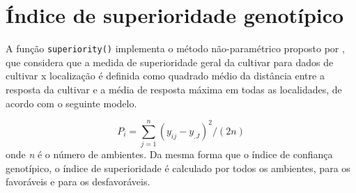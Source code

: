 \documentclass[
]{book}
\newenvironment{Shaded}{\begin{snugshade}}{\end{snugshade}}
\newcommand{\CommentTok}[1]{\textcolor[rgb]{0.56,0.35,0.01}{\textit{#1}}}
\newcommand{\KeywordTok}[1]{\textcolor[rgb]{0.13,0.29,0.53}{\textbf{#1}}}
\newcommand{\NormalTok}[1]{#1}
\newcommand{\OperatorTok}[1]{\textcolor[rgb]{0.81,0.36,0.00}{\textbf{#1}}}
\newcommand{\StringTok}[1]{\textcolor[rgb]{0.31,0.60,0.02}{#1}}
\begin{document}
\begin{Shaded}
\end{Shaded}

\hypertarget{uxedndice-de-superioridade-genotuxedpico}{%
\section{Índice de superioridade genotípico}\label{uxedndice-de-superioridade-genotuxedpico}}

A função \texttt{superiority()} implementa o método não-paramétrico proposto por \citet{Lin1988}, que considera que a medida de superioridade geral da cultivar para dados de cultivar x localização é definida como quadrado médio da distância entre a resposta da cultivar e a média de resposta máxima em todas as localidades, de acordo com o seguinte modelo.

\[
P_i = \sum \limits_{j = 1} ^ n {(y_ {ij} - y _ {. J}) ^ 2 / (2n)}
\]
onde \emph{n} é o número de ambientes. Da mesma forma que o índice de confiança genotípico, o índice de superioridade é calculado por todos os ambientes, para os favoráveis e para os desfavoráveis.
\end{document}
